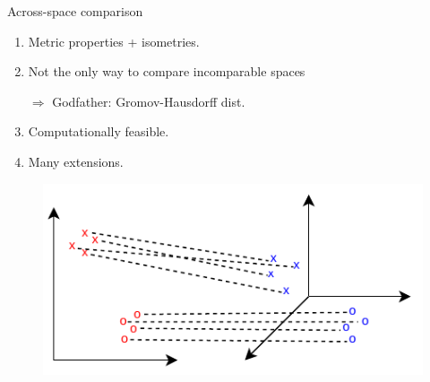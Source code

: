 \documentclass{beamer}
\begin{document}
\begin{frame}{Across-space comparison}
\vspace{-0.3cm}
\begin{minipage}[t]{0.5\linewidth}
\begin{enumerate}
  \item Metric properties + isometries.
  \item Not the only way to compare incomparable spaces

  $\Rightarrow$ Godfather: Gromov-Hausdorff dist.
  \item Computationally feasible.
  \item Many extensions.
\end{enumerate}
\end{minipage}%
\hfill%
\hspace{-6cm}
\begin{minipage}[t]{0.5\linewidth}
  \vspace{0.5cm}
\begin{figure}
  \centering
  \includegraphics[width=1.15\linewidth, keepaspectratio=true]{OT_new/gw.pdf}
\end{figure}
\end{minipage}

\end{frame}
\end{document}
